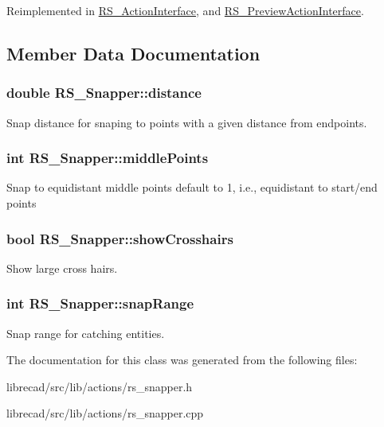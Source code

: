 Reimplemented in \hyperlink{classRS__ActionInterface_a7f4a0d32f846b52728b10c9dbaab6c78}{R\-S\-\_\-\-Action\-Interface}, and \hyperlink{classRS__PreviewActionInterface_a9f3b0c21f2b7b05ee53da53e197bda1b}{R\-S\-\_\-\-Preview\-Action\-Interface}.



\subsection{Member Data Documentation}
\hypertarget{classRS__Snapper_a4eb01ef2a485e653319522fb96185147}{
\subsubsection[{distance}]{\setlength{\rightskip}{0pt plus 5cm}double R\-S\-\_\-\-Snapper\-::distance\hspace{0.3cm}{\ttfamily [protected]}}}\label{classRS__Snapper_a4eb01ef2a485e653319522fb96185147}
Snap distance for snaping to points with a given distance from endpoints. \hypertarget{classRS__Snapper_aebc3dc03d9e59ae8a04eeee9c2709827}{
\subsubsection[{middle\-Points}]{\setlength{\rightskip}{0pt plus 5cm}int R\-S\-\_\-\-Snapper\-::middle\-Points\hspace{0.3cm}{\ttfamily [protected]}}}\label{classRS__Snapper_aebc3dc03d9e59ae8a04eeee9c2709827}
Snap to equidistant middle points default to 1, i.\-e., equidistant to start/end points \hypertarget{classRS__Snapper_ac0ecee6e6a8357e359c2db6b41227bc9}{
\subsubsection[{show\-Crosshairs}]{\setlength{\rightskip}{0pt plus 5cm}bool R\-S\-\_\-\-Snapper\-::show\-Crosshairs\hspace{0.3cm}{\ttfamily [protected]}}}\label{classRS__Snapper_ac0ecee6e6a8357e359c2db6b41227bc9}
Show large cross hairs. \hypertarget{classRS__Snapper_a5ed0cc04b5bb18a06bdbbd5900f22cce}{
\subsubsection[{snap\-Range}]{\setlength{\rightskip}{0pt plus 5cm}int R\-S\-\_\-\-Snapper\-::snap\-Range\hspace{0.3cm}{\ttfamily [protected]}}}\label{classRS__Snapper_a5ed0cc04b5bb18a06bdbbd5900f22cce}
Snap range for catching entities. 

The documentation for this class was generated from the following files\-:\begin{DoxyCompactItemize}
\item 
librecad/src/lib/actions/rs\-\_\-snapper.\-h\item 
librecad/src/lib/actions/rs\-\_\-snapper.\-cpp\end{DoxyCompactItemize}
